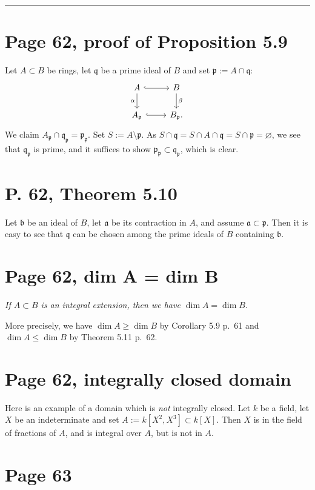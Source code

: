 \documentclass[12pt]{article}
\newcommand{\mf}{\mathfrak}
\begin{document}
\hrule\bigskip

\section{Page 62, proof of Proposition 5.9}%

Let $A\subset B$ be rings, let $\mf q$ be a prime ideal of $B$ and set $\mf p:=A\cap\mf q$:
$$
\begin{tikzcd}
A\ar[d,"\alpha"']\ar[r,hook]&B\ar[d,"\beta"]\\ 
A_{\mf p}\ar[r,hook]&B_{\mf p}.
\end{tikzcd}
$$
We claim $A_{\mf p}\cap\mf q_{\mf p}=\mf p_{\mf p}$. Set $S:=A\setminus\mf p$. As $S\cap\mf q=S\cap A\cap\mf q=S\cap\mf p=\varnothing$, we see that $\mf q_{\mf p}$ is prime, and it suffices to show $\mf p_{\mf p}\subset\mf q_{\mf p}$, which is clear.

\section{P. 62, Theorem 5.10}%

Let $\mf b$ be an ideal of $B$, let $\mf a$ be its contraction in $A$, and assume $\mf a\subset\mf p$. Then it is easy to see that $\mf q$ can be chosen among the prime ideals of $B$ containing $\mf b$.

\section{Page 62, dim A = dim B}%

\emph{If $A\subset B$ is an integral extension, then we have $\dim A=\dim B$.}

More precisely, we have $\dim A\ge\dim B$ by Corollary 5.9 p.~61 and $\dim A\le\dim B$ by Theorem 5.11 p.~62.

\section{Page 62, integrally closed domain}%

Here is an example of a domain which is \emph{not} integrally closed. Let $k$ be a field, let $X$ be an indeterminate and set $A:=k[X^2,X^3]\subset k[X]$. Then $X$ is in the field of fractions of $A$, and is integral over $A$, but is not in $A$.

\section{Page 63}%
\end{document}
